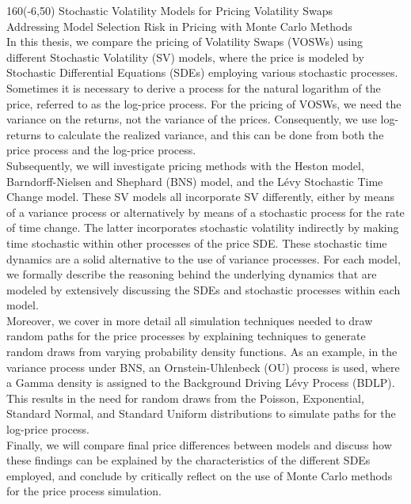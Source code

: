 \begin{textblock}{160}(-6,50)
\textblockcolour{}
\vspace{-\parskip}
\flushleft
\fontsize{40}{42}\selectfont \textcolor{bluetitle}{Stochastic Volatility Models for Pricing Volatility Swaps}\\[1.5mm]
\fontsize{20}{22}\selectfont Addressing Model Selection Risk in Pricing with Monte Carlo Methods\\[5.5mm]
\fontsize{10}{12}\selectfont \justify
In this thesis, we compare the pricing of Volatility Swaps (VOSWs) using different Stochastic Volatility (SV) models, where the price is modeled by Stochastic Differential Equations (SDEs) employing various stochastic processes. Sometimes it is necessary to derive a process for the natural logarithm of the price, referred to as the log-price process. For the pricing of VOSWs, we need the variance on the returns, not the variance of the prices. Consequently, we use log-returns to calculate the realized variance, and this can be done from both the price process and the log-price process. \\

Subsequently, we will investigate pricing methods with the Heston model, Barndorff-Nielsen and Shephard (BNS) model, and the Lévy Stochastic Time Change model. These SV models all incorporate SV differently, either by means of a variance process or alternatively by means of a stochastic process for the rate of time change. The latter incorporates stochastic volatility indirectly by making time stochastic within other processes of the price SDE. These stochastic time dynamics are a solid alternative to the use of variance processes. For each model, we formally describe the reasoning behind the underlying dynamics that are modeled by extensively discussing the SDEs and stochastic processes within each model. \\

Moreover, we cover in more detail all simulation techniques needed to draw random paths for the price processes by explaining techniques to generate random draws from varying probability density functions. As an example, in the variance process under BNS, an Ornstein-Uhlenbeck (OU) process is used, where a Gamma density is assigned to the Background Driving Lévy Process (BDLP). This results in the need for random draws from the Poisson, Exponential, Standard Normal, and Standard Uniform distributions to simulate paths for the log-price process. \\

Finally, we will compare final price differences between models and discuss how these findings can be explained by the characteristics of the different SDEs employed, and conclude by critically reflect on the use of Monte Carlo methods for the price process simulation.
\end{textblock}

\newpage
%
